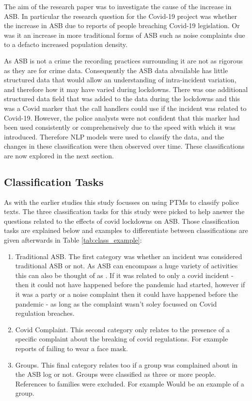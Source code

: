 The aim of the research paper was to investigate the cause of the increase in ASB. In particular the research question for the Covid-19 project was whether the increase in ASB due to reports of people breaching Covid-19 legislation. Or was it an increase in more traditional forms of ASB such as noise complaints due to a defacto increased population density. 

As ASB is not a crime the recording practices surrounding it are not as rigorous as they are for crime data. Consequently the ASB data abvailable has little structured data that would allow an understanding of intra-incident variation, and therefore how it may have varied during lockdowns. There was one additional structured data field that was added to the data during the lockdowns and this was a Covid marker that the call handlers could use if the incident was related to Covid-19. However, the police analysts were not confident that this marker had been used consistently or comprehensively due to the speed with which it was introduced. Therefore NLP models were used to classify the data, and the changes in these classification were then observed over time. These classifications are now explored in the next section.
 
\subsection{Classification Tasks} As with the earlier studies this study focusses on using PTMs to classify police texts. The three classification tasks for this study were picked to help answer the questions related to the effects of covid lockdowns on ASB. Those classification tasks are explained below and examples to differentiate between classifications are given afterwards in Table \ref{tab:class_example}:

\begin{enumerate}
\item{Traditional ASB.} The first category was whether an incident was considered traditional ASB or not. As ASB can encompass a huge variety of activities this can also be thought of as . If it was related to only a covid incident - then it could not have happened before the pandemic had started, however if it was a party or a noise complaint then it could have happened before the pandemic - as long as the complaint wasn't soley focussed on Covid regulation breaches.
\item{Covid Complaint.} This second category only relates to the presence of a specific complaint about the breaking of covid regulations. For example reports of failing to wear a face mask.
\item{Groups.} This final category relates too if a group was complained about in the ASB log or not. Groups were classified as three or more people. References to families were excluded. For example  Would be an example of a group.

\end{enumerate}


